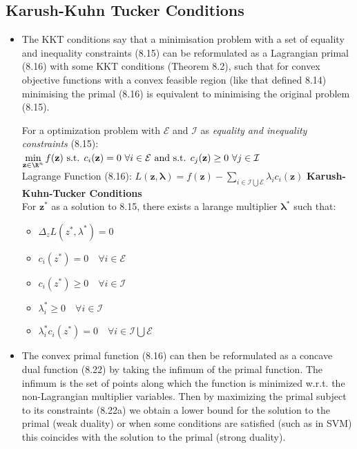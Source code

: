 \documentclass[english]{latex4ei/latex4ei_sheet}
\begin{document}
\begin{sectionbox}
\subsection{Karush-Kuhn Tucker Conditions}
\begin{itemize}
\item The KKT conditions say that a minimisation problem with a set of equality and inequality constraints (8.15) can be reformulated as a Lagrangian primal (8.16) with some KKT conditions (Theorem 8.2), such that for convex objective functions with a convex feasible region (like that defined 8.14) minimising the primal (8.16) is equivalent to minimising the original problem (8.15).
\begin{emphbox}
    For a optimization problem with $\mathcal{E}$ and $\mathcal{I}$ as \emph{equality and inequality constraints} (8.15):\\
    $\min\limits_{\mathbf{z}\in\R^n}f(\mathbf{z}) \ \mbox{s.t. } c_i(\mathbf{z}) = 0 \ \forall i\in\mathcal{E} \ \mbox{and s.t. } c_j(\mathbf{z}) \ge 0 \ \forall j\in\mathcal{I}$\\
    Lagrange Function (8.16): $L(\mathbf{z,\lambda})=f(\mathbf{z})-\sum\limits_{i\in\mathcal{I}\bigcup\mathcal{E}}\lambda_ic_i(\mathbf{z})$
    \textbf{Karush-Kuhn-Tucker Conditions}\\
    For $\mathbf{z^*}$ as a solution to 8.15, there exists a larange multiplier $\mathbf{\lambda^*}$ such that:\\
    \begin{itemize}
        \item $\Delta_zL(z^*,\lambda^*)=0$
        \item $c_i(z^*)=0 \quad \forall i\in\mathcal{E}$
        \item $c_i(z^*)\ge0 \quad \forall i \in\mathcal{I}$
        \item $\lambda_i^* \ge0 \quad \forall i\in\mathcal{I}$
        \item $\lambda_i^*c_i(z^*)=0 \quad \forall i\in\mathcal{I}\bigcup\mathcal{E}$
    \end{itemize}
\end{emphbox}
\item The convex primal function (8.16) can then be reformulated as a concave dual function (8.22) by taking the infimum of the primal function. The infimum is the set of points along which the function is minimized w.r.t. the non-Lagrangian multiplier variables. Then by maximizing the primal subject to its constraints (8.22a) we obtain a lower bound for the solution to the primal (weak duality) or when some conditions are satisfied (such as in SVM) this coincides with the solution to the primal (strong duality).
\end{itemize}


\end{sectionbox}
\end{document}
